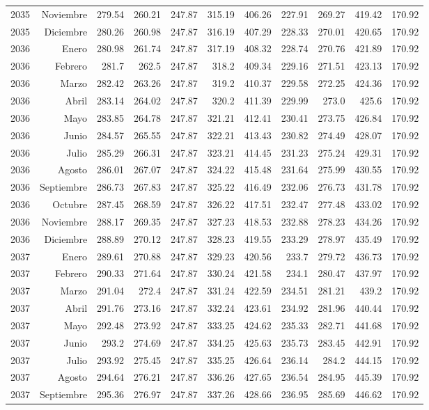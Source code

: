 \documentclass{article}%
\begin{document}
\begin{longtable}{|l r|r|r|r|r|r|r|r|r|r|}
2035&Noviembre&279.54&260.21&247.87&315.19&406.26&227.91&269.27&419.42&170.92\\%
2035&Diciembre&280.26&260.98&247.87&316.19&407.29&228.33&270.01&420.65&170.92\\%
2036&Enero&280.98&261.74&247.87&317.19&408.32&228.74&270.76&421.89&170.92\\%
2036&Febrero&281.7&262.5&247.87&318.2&409.34&229.16&271.51&423.13&170.92\\%
2036&Marzo&282.42&263.26&247.87&319.2&410.37&229.58&272.25&424.36&170.92\\%
2036&Abril&283.14&264.02&247.87&320.2&411.39&229.99&273.0&425.6&170.92\\%
2036&Mayo&283.85&264.78&247.87&321.21&412.41&230.41&273.75&426.84&170.92\\%
2036&Junio&284.57&265.55&247.87&322.21&413.43&230.82&274.49&428.07&170.92\\%
2036&Julio&285.29&266.31&247.87&323.21&414.45&231.23&275.24&429.31&170.92\\%
2036&Agosto&286.01&267.07&247.87&324.22&415.48&231.64&275.99&430.55&170.92\\%
2036&Septiembre&286.73&267.83&247.87&325.22&416.49&232.06&276.73&431.78&170.92\\%
2036&Octubre&287.45&268.59&247.87&326.22&417.51&232.47&277.48&433.02&170.92\\%
2036&Noviembre&288.17&269.35&247.87&327.23&418.53&232.88&278.23&434.26&170.92\\%
2036&Diciembre&288.89&270.12&247.87&328.23&419.55&233.29&278.97&435.49&170.92\\%
2037&Enero&289.61&270.88&247.87&329.23&420.56&233.7&279.72&436.73&170.92\\%
2037&Febrero&290.33&271.64&247.87&330.24&421.58&234.1&280.47&437.97&170.92\\%
2037&Marzo&291.04&272.4&247.87&331.24&422.59&234.51&281.21&439.2&170.92\\%
2037&Abril&291.76&273.16&247.87&332.24&423.61&234.92&281.96&440.44&170.92\\%
2037&Mayo&292.48&273.92&247.87&333.25&424.62&235.33&282.71&441.68&170.92\\%
2037&Junio&293.2&274.69&247.87&334.25&425.63&235.73&283.45&442.91&170.92\\%
2037&Julio&293.92&275.45&247.87&335.25&426.64&236.14&284.2&444.15&170.92\\%
2037&Agosto&294.64&276.21&247.87&336.26&427.65&236.54&284.95&445.39&170.92\\%
2037&Septiembre&295.36&276.97&247.87&337.26&428.66&236.95&285.69&446.62&170.92\\%

\end{longtable}
\end{document}
